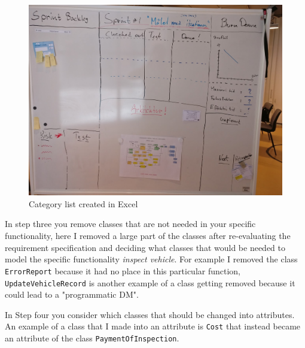 \documentclass[a4paper]{scrreprt}
\begin{document}
\begin{figure}[h]
  \begin{center}
    \includegraphics[scale=0.2]{test.jpg}
    \caption{Category list created in Excel}
    \label{fig:category}
  \end{center}
\end{figure}

\noindent In step three you remove classes that are not needed in your specific functionality, here I removed a large part of the classes after re-evaluating the requirement specification and deciding what classes that would be needed to model the specific functionality \textit{inspect vehicle}. For example I removed the class \texttt{ErrorReport} because it had no place in this particular function, \texttt{UpdateVehicleRecord} is another example of a class getting removed because it could lead to a "programmatic DM".

In Step four you consider which classes that should be changed into attributes. An example of a class that I made into an attribute is \texttt{Cost} that instead became an attribute of the class \texttt{PaymentOfInspection}.
\end{document}
